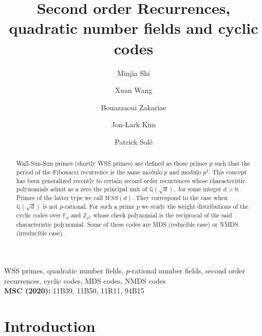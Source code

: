 \documentclass[12pt,reqno]{amsart}
\title{ Second order Recurrences, quadratic number fields and cyclic codes}
\author{Minjia Shi}
\author{Xuan Wang}
\author{Bouazzaoui Zakariae}
\author{Jon-Lark Kim}
\author{Patrick Sol\'e}
\date{}
\newcommand{\F}{\mathbb{F}}
\newcommand{\Z}{\mathbb{Z}}
\newcommand{\Q}{\mathbb{Q}}
\begin{document}
\maketitle
\begin{abstract}
 Wall-Sun-Sun primes (shortly WSS primes) are defined as those primes $p$  such that the period of the Fibonacci recurrence is the same modulo
 $p$ and modulo $p^2.$ This concept has been generalized recently to certain second order recurrences whose characteristic polynomials admit as a zero the principal unit of $\Q(\sqrt{d}),$
 for some integer $d>0.$ Primes of the latter type we call $WSS(d).$ They correspond to the case when $\Q(\sqrt{d})$ is not $p$-rational. For such a prime $p$
 we study the weight distributions of the cyclic codes over $\F_p$ and $\Z_{p^2}$ whose
 check polynomial is the reciprocal of the said characteristic polynomial. Some of these codes are MDS (reducible case) or NMDS (irreducible case).
\end{abstract}

 WSS primes, quadratic number fields, $p$-rational number fields, second order recurrences, cyclic codes, MDS codes, NMDS codes\\
{\bf MSC (2020):} 11B39, 11B50, 11R11, 94B15
\section{Introduction}
\end{document}
